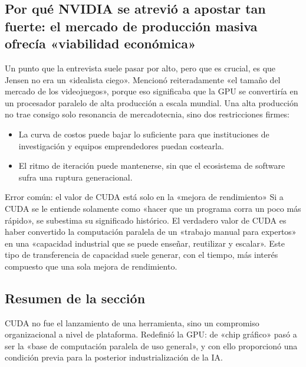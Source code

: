 \subsection{Por qué NVIDIA se atrevió a apostar tan fuerte: el mercado de producción masiva ofrecía «viabilidad económica»}

Un punto que la entrevista suele pasar por alto, pero que es crucial, es que Jensen no era un «idealista ciego». Mencionó reiteradamente «el tamaño del mercado de los videojuegos», porque eso significaba que la GPU se convertiría en un procesador paralelo de alta producción a escala mundial. Una alta producción no trae consigo solo resonancia de mercadotecnia, sino dos restricciones firmes:
\begin{itemize}
    \item La curva de costos puede bajar lo suficiente para que instituciones de investigación y equipos emprendedores puedan costearla.
    \item El ritmo de iteración puede mantenerse, sin que el ecosistema de software sufra una ruptura generacional.
\end{itemize}

\begin{warningbox}{Error común: el valor de CUDA está solo en la «mejora de rendimiento»}
Si a CUDA se le entiende solamente como «hacer que un programa corra un poco más rápido», se subestima su significado histórico. El verdadero valor de CUDA es haber convertido la computación paralela de un «trabajo manual para expertos» en una «capacidad industrial que se puede enseñar, reutilizar y escalar». Este tipo de transferencia de capacidad suele generar, con el tiempo, más interés compuesto que una sola mejora de rendimiento.
\end{warningbox}

\subsection{Resumen de la sección}
CUDA no fue el lanzamiento de una herramienta, sino un compromiso organizacional a nivel de plataforma. Redefinió la GPU: de «chip gráfico» pasó a ser la «base de computación paralela de uso general», y con ello proporcionó una condición previa para la posterior industrialización de la IA.
